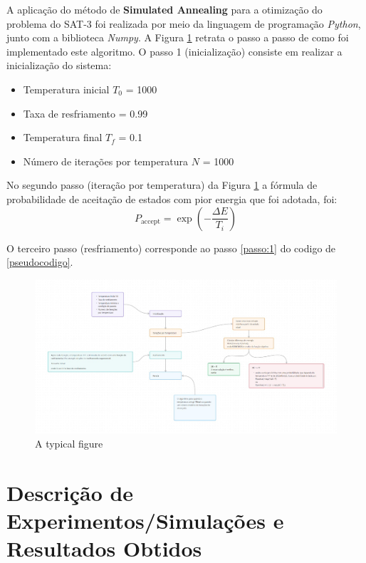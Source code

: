 \documentclass[12pt]{article}
\begin{document}
A aplicação do método de \textbf{Simulated Annealing} para a otimização do problema do SAT-3 foi realizada por meio da linguagem de programação \textit{Python}, junto com a biblioteca \textit{Numpy}.
%
A Figura \ref{fig:metodologia} retrata o passo a passo de como foi implementado este algoritmo.
%
O passo 1 (inicialização) consiste em realizar a inicialização do sistema:

\begin{itemize}
  \item Temperatura inicial $T_0$ = 1000
  \item Taxa de resfriamento \alpha = 0.99
  \item Temperatura final $T_f$ = 0.1
  \item Número de iterações por temperatura $N$ = 1000
\end{itemize}

No segundo passo (iteração por temperatura) da Figura \ref{fig:metodologia} a fórmula de probabilidade de aceitação de estados com pior energia que foi adotada, foi:
\begin{equation}
  P_{\text{accept}} = \exp\left(-\frac{\Delta E}{T_i}\right)
\end{equation}

O terceiro passo (resfriamento) corresponde ao passo \ref{passo:1} do codigo de \ref{pseudocodigo}.

\begin{figure}[ht]
  \centering
  \includegraphics[width=1\textwidth]{pasta_.jpeg}
  \caption{A typical figure}
  \label{fig:metodologia}
  \end{figure}

\section{Descrição de Experimentos/Simulações e Resultados Obtidos}
\end{document}
